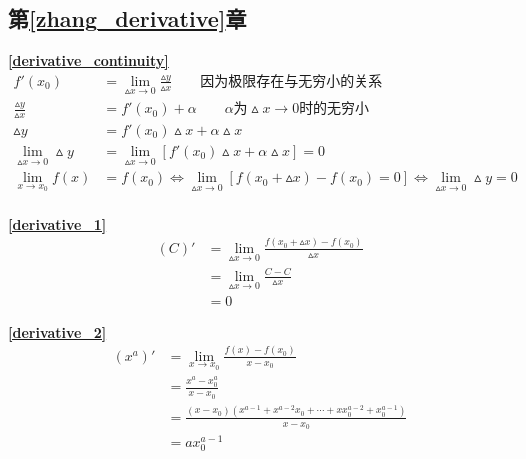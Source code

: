\subsection{\centering 第\ref{zhang_derivative}章}
\textbf{\large \ref{derivative_continuity}}
\begin{displaymath}
    \begin{split}
        f'(x_0)&=\lim\limits_{\vartriangle x\to 0}\frac{\vartriangle y}{\vartriangle x}\qquad\mbox{因为极限存在与无穷小的关系}\\
        \frac{\vartriangle y}{\vartriangle x}&=f'(x_0)+\alpha\qquad\alpha \mbox{为}\vartriangle x\to 0\mbox{时的无穷小}\\
        \vartriangle y&=f'(x_0)\vartriangle x+\alpha\vartriangle x\\
        \lim\limits_{\vartriangle x\to 0}\vartriangle y&=\lim\limits_{\vartriangle x\to 0}\left[f'(x_0)\vartriangle x+\alpha\vartriangle x\right]=0\\
        \lim\limits_{x\to x_0}f(x)&=f(x_0)\Leftrightarrow \lim\limits_{\vartriangle x\to 0}\left[f(x_0+\vartriangle x)-f(x_0)=0\right]\Leftrightarrow\lim\limits_{\vartriangle x\to 0}\vartriangle y=0 \\
    \end{split}
\end{displaymath}

\textbf{\large \ref{derivative_1}}
\begin{displaymath}
    \begin{split}
        (C)'&=\lim\limits_{\vartriangle x\to 0}\frac{f(x_0+\vartriangle x)-f(x_0)}{\vartriangle x}\\
        &=\lim\limits_{\vartriangle x\to 0} \frac{C-C}{\vartriangle x}\\
        &=0
    \end{split}
\end{displaymath}

\textbf{\large \ref{derivative_2}}
\begin{displaymath}
    \begin{split}
        \left(x^a\right)'&=\lim\limits_{x\to x_0}\frac{f(x)-f(x_0)}{x-x_0}\\
        &=\frac{x^a-x_0^a}{x-x_0}\\
        &=\frac{(x-x_0)\left(x^{a-1}+x^{a-2}x_0+\cdots+xx_0^{a-2}+x_0^{a-1}\right)}{x-x_0}\\
        &=ax_0^{a-1}
    \end{split}
\end{displaymath}

